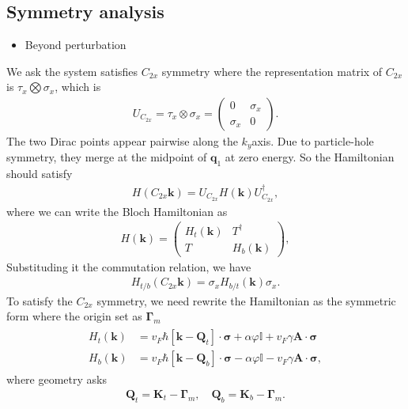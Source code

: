 \documentclass[10pt, oneside]{article}
\newcommand{\vph}{\varphi}
\newcommand{\p}[1]{\left(#1\right)}
\newcommand{\bb}[1]{\left[#1\right]}
\begin{document}
\subsection{Symmetry analysis}
\begin{itemize}
	\item Beyond perturbation
\end{itemize}
We ask the system satisfies \(C_{2x}\) symmetry where the representation matrix of \(C_{2x}\) is \(\tau_{x} \bigotimes \sigma_{x} \), which is 
\begin{align}
	U_{C_{2x}} = \tau_{x} \otimes \sigma_{x} = \begin{pmatrix}
		0 & \sigma_{x} \\
		\sigma_{x} & 0
	\end{pmatrix}.	
\end{align}
The two Dirac points appear pairwise along the \(k_y\)axis. Due to particle-hole symmetry, they merge at the midpoint of \(\bm{q}_1\) at zero energy. So the Hamiltonian should satisfy
\begin{align}
	H(C_{2x} \bm{k}) = U_{C_{2x}} H(\bm{k}) U_{C_{2x}}^{\dagger},
\end{align}
where we can write the Bloch Hamiltonian as 
\begin{align}
	H\p{\bm{k}} = \begin{pmatrix}
		H_{t}\p{\bm{k}} & T^\dagger \\
		T & H_{b}\p{\bm{k}}
	\end{pmatrix},
\end{align}
Substituding it the commutation relation, we have
\begin{align}
	H_{t/b}\p{C_{2x}\bm{k}} = \sigma_{x} H_{b/t}\p{\bm{k}} \sigma_{x}.
\end{align}
To satisfy the \(C_{2x}\) symmetry, we need rewrite the Hamiltonian as the symmetric form where the origin set as \(\bm{\Gamma}_{m}\)
\begin{align}
	\begin{split}
		H_{t}\p{\bm{k}} & = v_{F} \hbar \bb{\bm{k} - \bm{Q}_{t}} \cdot \bm{\sigma} + \alpha \vph \mathbb{I} + v_{F} \gamma \bm{A} \cdot \bm{\sigma} \\
		H_{b}\p{\bm{k}} & = v_{F} \hbar \bb{\bm{k} - \bm{Q}_{b}} \cdot \bm{\sigma} - \alpha \vph \mathbb{I} - v_{F} \gamma \bm{A} \cdot \bm{\sigma},
	\end{split}
\end{align}
where geometry asks 
\begin{align}
		\bm{Q}_{t}  = \bm{K}_{t} - \bm{\Gamma}_{m}, \quad \bm{Q}_{b} = \bm{K}_{b} - \bm{\Gamma}_{m}.
\end{align}
\end{document}
